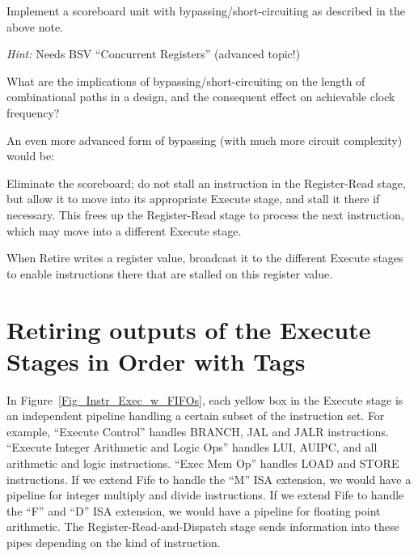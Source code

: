 \Exercise

Implement a scoreboard unit with bypassing/short-circuiting as
described in the above note.

\emph{Hint:} Needs BSV ``Concurrent Registers'' (advanced topic!)

\Exercise

What are the implications of bypassing/short-circuiting on the length
of combinational paths in a design, and the consequent effect on
achievable clock frequency?

\Endexercise

An even more advanced form of bypassing (with much more circuit
complexity) would be:

\begin{tightlist}

 \item Eliminate the scoreboard; do not stall an instruction in the
     Register-Read stage, but allow it to move into its appropriate
     Execute stage, and stall it there if necessary.  This frees up
     the Register-Read stage to process the next instruction, which
     may move into a different Execute stage.

 \item When Retire writes a register value, broadcast it to the
     different Execute stages to enable instructions there that are
     stalled on this register value.

\end{tightlist}


\section{Retiring outputs of the Execute Stages in Order with Tags}

\label{Sec_Reorder_Tags}

In Figure~\ref{Fig_Instr_Exec_w_FIFOs}, each yellow box in the Execute
stage is an independent pipeline handling a certain subset of the
instruction set.  For example, ``Execute Control'' handles BRANCH, JAL
and JALR instructions. ``Execute Integer Arithmetic and Logic Ops''
handles LUI, AUIPC, and all arithmetic and logic instructions.  ``Exec
Mem Op'' handles LOAD and STORE instructions.  If we extend Fife to
handle the ``M'' ISA extension, we would have a pipeline for integer
multiply and divide instructions.  If we extend Fife to handle the
``F'' and ``D'' ISA extension, we would have a pipeline for floating
point arithmetic.  The Register-Read-and-Dispatch stage sends
information into these pipes depending on the kind of instruction.

